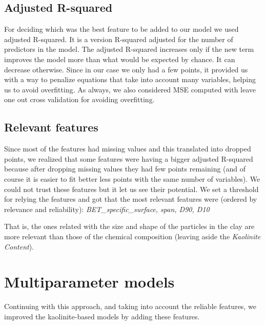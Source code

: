 \documentclass[10pt,conference,compsocconf]{IEEEtran}
\begin{document}
\subsection{Adjusted R-squared}
For deciding which was the best feature to be added to our model we used adjusted R-squared. It is a version R-squared adjusted for the number of predictors in the model. The adjusted R-squared increases only if the new term improves the model more than what would be expected by chance. It can decrease otherwise. Since in our case we only had a few points, it provided us with a way to penalize equations that take into account many variables, helping us to avoid overfitting. As always, we also considered MSE computed with leave one out cross validation for avoiding overfitting.

\subsection{Relevant features}
Since most of the features had missing values and this translated into dropped points, we realized that some features were having a bigger adjusted R-squared because after dropping missing values they had few points remaining (and of course it is easier to fit better less points with the same number of variables). We could not trust these features but it let us see their potential. We set a threshold for relying the features and got that the most relevant features were (ordered by relevance and reliability):
\textit{BET\_specific\_surface, span, D90, D10}

That is, the ones related with the size and shape of the particles in the clay are more relevant than those of the chemical composition (leaving aside the \textit{Kaolinite Content}).

\section{Multiparameter models}
Continuing with this approach, and taking into account the reliable features, we improved the kaolinite-based models by adding these features.
\end{document}
